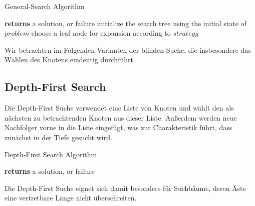 \begin{algorithm}
\caption{General-Search Algorithm}
\begin{algorithmic}[1]
 \State \textbf{returns} a solution, or failure
\State initialize the search tree using the initial state of $problem$
\Loop \State choose a leaf node for expansion according to $strategy$
\EndLoop
\EndFunction
\end{algorithmic}
\end{algorithm}


Wir betrachten im Folgenden Varianten der blinden Suche, die insbesondere das Wählen des Knotens eindeutig durchführt.

\subsection{Depth-First Search}
Die Depth-First Suche verwendet eine Liste von Knoten und wählt den als nächsten zu betrachtenden Knoten aus dieser Liste. Außerdem werden neue Nachfolger vorne in die Liste eingefügt, was zur Charakteristik führt, dass zunächst in der Tiefe gesucht wird.

\begin{algorithm}
\caption{Depth-First Search Algorithm}
\begin{algorithmic}[1]
 \State \textbf{returns} a solution, or failure
\EndFunction
\EndFunction
\end{algorithmic}
\end{algorithm}

Die Depth-First Suche eignet sich damit besonders für Suchbäume, deren Äste eine vertretbare Länge nicht überschreiten.

